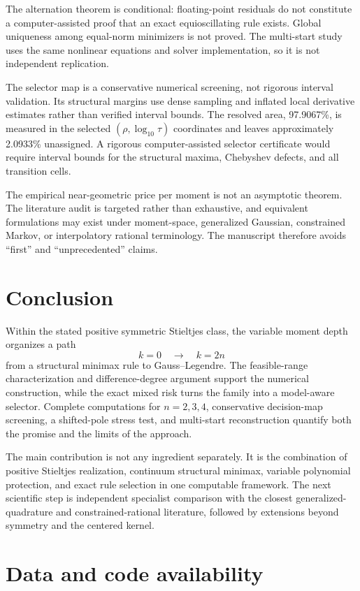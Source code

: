 \documentclass[preprint,12pt]{elsarticle}
\theoremstyle{remark}
\begin{document}
The alternation theorem is conditional: floating-point residuals do not
constitute a computer-assisted proof that an exact equioscillating rule
exists. Global uniqueness among equal-norm minimizers is not proved.
The multi-start study uses the same nonlinear equations and solver
implementation, so it is not independent replication.

The selector map is a conservative numerical screening, not rigorous
interval validation. Its structural margins use dense sampling and
inflated local derivative estimates rather than verified interval
bounds. The resolved area, 97.9067\%, is measured in the selected
\((\rho,\log_{10}\tau)\) coordinates and leaves approximately
2.0933\% unassigned. A rigorous computer-assisted selector certificate
would require interval bounds for the structural maxima, Chebyshev
defects, and all transition cells.

The empirical near-geometric price per moment is not an asymptotic
theorem. The literature audit is targeted rather than exhaustive, and
equivalent formulations may exist under moment-space, generalized
Gaussian, constrained Markov, or interpolatory rational terminology.
The manuscript therefore avoids ``first'' and ``unprecedented'' claims.

\section{Conclusion}

Within the stated positive symmetric Stieltjes class, the variable
moment depth organizes a path
\[
k=0
\quad\longrightarrow\quad
k=2n
\]
from a structural minimax rule to Gauss--Legendre. The
feasible-range characterization and difference-degree argument support
the numerical construction, while the exact mixed risk turns the family
into a model-aware selector. Complete computations for \(n=2,3,4\),
conservative decision-map screening, a shifted-pole stress test, and
multi-start reconstruction quantify both the promise and the limits of
the approach.

The main contribution is not any ingredient separately. It is the
combination of positive Stieltjes realization, continuum structural
minimax, variable polynomial protection, and exact rule selection in one
computable framework. The next scientific step is independent
specialist comparison with the closest generalized-quadrature and
constrained-rational literature, followed by extensions beyond symmetry
and the centered kernel.

\section*{Data and code availability}
\end{document}
